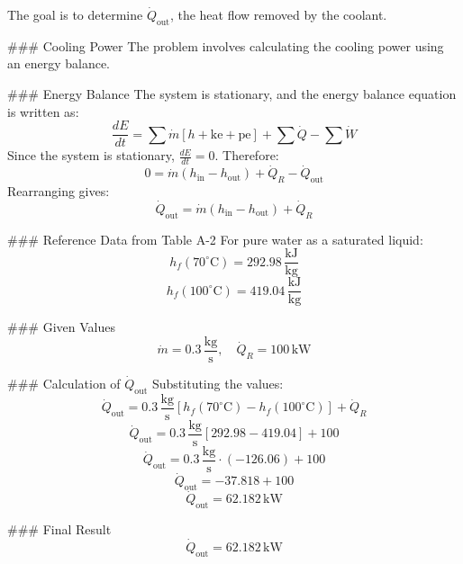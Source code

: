 The goal is to determine \( \dot{Q}_{\text{out}} \), the heat flow removed by the coolant.

### Cooling Power  
The problem involves calculating the cooling power using an energy balance.

### Energy Balance  
The system is stationary, and the energy balance equation is written as:  
\[
\frac{dE}{dt} = \sum \dot{m} \left[ h + \text{ke} + \text{pe} \right] + \sum \dot{Q} - \sum \dot{W}
\]  
Since the system is stationary, \( \frac{dE}{dt} = 0 \). Therefore:  
\[
0 = \dot{m} \left( h_{\text{in}} - h_{\text{out}} \right) + \dot{Q}_R - \dot{Q}_{\text{out}}
\]  
Rearranging gives:  
\[
\dot{Q}_{\text{out}} = \dot{m} \left( h_{\text{in}} - h_{\text{out}} \right) + \dot{Q}_R
\]

### Reference Data from Table A-2  
For pure water as a saturated liquid:  
\[
h_f(70^\circ\text{C}) = 292.98 \, \frac{\text{kJ}}{\text{kg}}
\]  
\[
h_f(100^\circ\text{C}) = 419.04 \, \frac{\text{kJ}}{\text{kg}}
\]  

### Given Values  
\[
\dot{m} = 0.3 \, \frac{\text{kg}}{\text{s}}, \quad \dot{Q}_R = 100 \, \text{kW}
\]

### Calculation of \( \dot{Q}_{\text{out}} \)  
Substituting the values:  
\[
\dot{Q}_{\text{out}} = 0.3 \, \frac{\text{kg}}{\text{s}} \left[ h_f(70^\circ\text{C}) - h_f(100^\circ\text{C}) \right] + \dot{Q}_R
\]  
\[
\dot{Q}_{\text{out}} = 0.3 \, \frac{\text{kg}}{\text{s}} \left[ 292.98 - 419.04 \right] + 100
\]  
\[
\dot{Q}_{\text{out}} = 0.3 \, \frac{\text{kg}}{\text{s}} \cdot (-126.06) + 100
\]  
\[
\dot{Q}_{\text{out}} = -37.818 + 100
\]  
\[
\dot{Q}_{\text{out}} = 62.182 \, \text{kW}
\]

### Final Result  
\[
\dot{Q}_{\text{out}} = 62.182 \, \text{kW}
\]